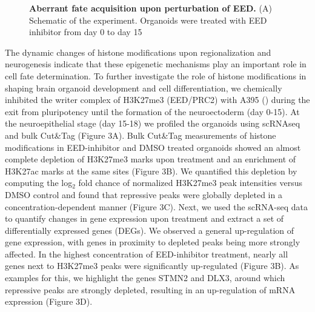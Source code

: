 \begin{figure}[t!]
    \caption{\textbf{Aberrant fate acquisition upon perturbation of EED.}
    (A) Schematic of the experiment. Organoids were treated with EED inhibitor from day 0 to day 15} 
\end{figure}


The dynamic changes of histone modifications upon regionalization and neurogenesis indicate that these epigenetic mechanisms play an important role in cell fate determination. To further investigate the role of histone modifications in shaping brain organoid development and cell differentiation, we chemically inhibited the writer complex of H3K27me3 (EED/PRC2) with A395 (\cite{he_eed_2017}) during the exit from pluripotency until the formation of the neuroectoderm (day 0-15). At the neuroepithelial stage (day 15-18) we profiled the organoids using scRNAseq and bulk Cut\&Tag (Figure 3A). Bulk Cut\&Tag measurements of histone modifications in EED-inhibitor and DMSO treated organoids showed an almost complete depletion of H3K27me3 marks upon treatment and an enrichment of H3K27ac marks at the same sites (Figure 3B). We quantified this depletion by computing the log$_2$ fold chance of normalized H3K27me3 peak intensities versus DMSO control and found that repressive peaks were globally depleted in a concentration-dependent manner (Figure 3C). Next, we used the scRNA-seq data to quantify changes in gene expression upon treatment and extract a set of differentially expressed genes (DEGs). We observed a general up-regulation of gene expression, with genes in proximity to depleted peaks being more strongly affected. In the highest concentration of EED-inhibitor treatment, nearly all genes next to H3K27me3 peaks were significantly up-regulated (Figure 3B). As examples for this, we highlight the genes STMN2 and DLX3, around which repressive peaks are strongly depleted, resulting in an up-regulation of mRNA expression (Figure 3D).

